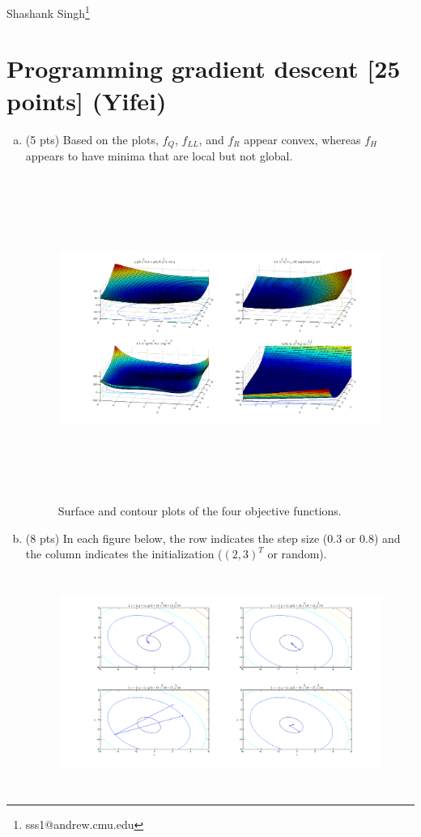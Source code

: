 \documentclass[11pt]{article}
\begin{document}
\newpage
Shashank Singh\footnote{sss1@andrew.cmu.edu}
\section{Programming gradient descent [25 points] (Yifei)}
\begin{enumerate}[(a)]
\item (5 pts) Based on the plots, $f_Q$, $f_{LL}$, and $f_R$ appear convex,
whereas $f_H$ appears to have minima that are local but not global.
\begin{figure}[h!]
\begin{center}
\includegraphics[width=400pt,height=300pt]{fig3a}
\end{center}
\caption{Surface and contour plots of the four objective functions.}
\label{fig:ezsurfc}
\end{figure}
\item (8 pts) In each figure below, the row indicates the step size ($0.3$ or
$0.8$) and the column indicates the initialization ($(2,3)^T$ or random).
\begin{figure}[h!]
\begin{center}
\includegraphics[width=300pt,height=200pt]{fig3b1}

\end{center}
\end{figure}
\end{enumerate}
\end{document}
